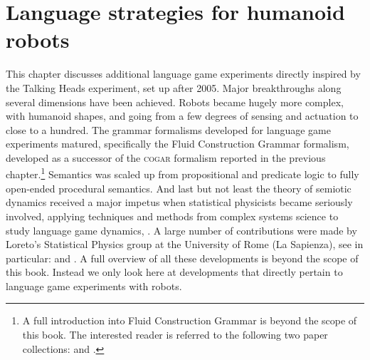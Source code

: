 \chapter{Language strategies for humanoid robots}

This chapter discusses additional language game experiments directly inspired by the Talking Heads experiment, 
set up after 2005. Major breakthroughs along several dimensions have been achieved. Robots became hugely 
more complex, with humanoid shapes, and going from a few degrees of sensing and actuation to close to a hundred. The grammar 
formalisms developed for language game experiments matured, specifically the Fluid Construction Grammar formalism, developed 
as a successor of the \textsc{cogar} formalism reported in the previous chapter.\footnote{
A full introduction into Fluid Construction Grammar  
is beyond the scope of this book. The interested reader is 
referred to the following two paper collections: \cite{Steels:2011} and \cite{Steels:2012}.}
Semantics was scaled up from propositional and predicate logic to fully open-ended procedural semantics.
And last but not least the theory of semiotic dynamics received a major impetus when statistical physicists became seriously 
involved, applying techniques and methods from complex systems science to study language game
dynamics, \cite{Loreto:2007}. 
A large number of contributions were made by Loreto's Statistical Physics group at the University of Rome (La Sapienza), 
see in particular: \cite{DallaAsta:2006} and \cite{Baronchelli:2012}.
A full overview of all these developments is beyond the 
scope of this book. Instead we only look here at developments that directly pertain to language game experiments with robots. 

